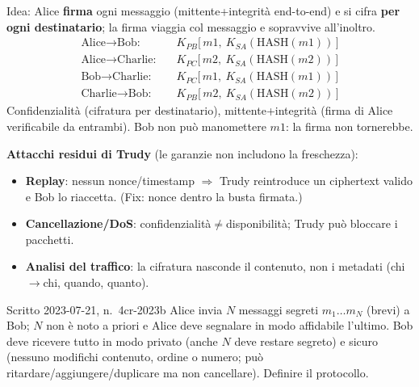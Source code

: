 \documentclass{report}
\newcommand{\Ks}[1]{K_{S#1}}   %
\newcommand{\Kp}[1]{K_{P#1}}   %
\newcommand{\HASH}{\text{HASH}}
\begin{document}
\begin{solution}
Idea: Alice \textbf{firma} ogni messaggio (mittente+integrità end-to-end) e si
cifra \textbf{per ogni destinatario}; la firma viaggia col messaggio e
sopravvive all'inoltro.
\begin{align*}
\text{Alice}\to\text{Bob:}\quad & \Kp{B}\big[\,m1,\ \Ks{A}(\HASH(m1))\,\big]\\
\text{Alice}\to\text{Charlie:}\quad & \Kp{C}\big[\,m2,\ \Ks{A}(\HASH(m2))\,\big]\\
\text{Bob}\to\text{Charlie:}\quad & \Kp{C}\big[\,m1,\ \Ks{A}(\HASH(m1))\,\big]\\
\text{Charlie}\to\text{Bob:}\quad & \Kp{B}\big[\,m2,\ \Ks{A}(\HASH(m2))\,\big]
\end{align*}
Confidenzialità (cifratura per destinatario), mittente+integrità (firma di Alice
verificabile da entrambi). Bob non può manomettere $m1$: la firma non tornerebbe.

\medskip
\textbf{Attacchi residui di Trudy} (le garanzie non includono la freschezza):
\begin{itemize}
\item \textbf{Replay}: nessun nonce/timestamp $\Rightarrow$ Trudy reintroduce un
ciphertext valido e Bob lo riaccetta. (Fix: nonce dentro la busta firmata.)
\item \textbf{Cancellazione/DoS}: confidenzialità$\ne$disponibilità; Trudy può
bloccare i pacchetti.
\item \textbf{Analisi del traffico}: la cifratura nasconde il contenuto, non i
metadati (chi$\to$chi, quando, quanto).
\end{itemize}
\end{solution}

\begin{Exercise}{Scritto 2023-07-21, n.\ 4}{cr-2023b}
Alice invia $N$ messaggi segreti $m_1\dots m_N$ (brevi) a Bob; $N$ non è noto a
priori e Alice deve segnalare in modo affidabile l'ultimo. Bob deve ricevere
tutto in modo privato (anche $N$ deve restare segreto) e sicuro (nessuno
modifichi contenuto, ordine o numero; può ritardare/aggiungere/duplicare ma non
cancellare). Definire il protocollo.
\end{Exercise}
\end{document}
